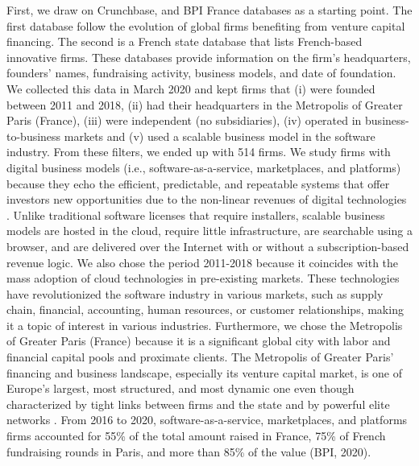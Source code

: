 \documentclass[12pt]{article}
\begin{document}
First, we draw on Crunchbase, and BPI France databases as a starting point. The first database follow the evolution of global firms benefiting from venture capital financing. The second is a French state database that lists French-based innovative firms. These databases provide information on the firm’s headquarters, founders’ names, fundraising activity, business models, and date of foundation. We collected this data in March 2020 and kept firms that (i) were founded between 2011 and 2018, (ii) had their headquarters in the Metropolis of Greater Paris (France), (iii) were independent (no subsidiaries), (iv) operated in business-to-business markets and (v) used a scalable business model in the software industry. From these filters, we ended up with 514 firms. We study firms with digital business models (i.e., software-as-a-service, marketplaces, and platforms) because they echo the efficient, predictable, and repeatable systems that offer investors new opportunities due to the non-linear revenues of digital technologies \citep{nambisan2017digital}. Unlike traditional software licenses that require installers, scalable business models are hosted in the cloud, require little infrastructure, are searchable using a browser, and are delivered over the Internet with or without a subscription-based revenue logic. We also chose the period 2011-2018 because it coincides with the mass adoption of cloud technologies in pre-existing markets. These technologies have revolutionized the software industry in various markets, such as supply chain, financial, accounting, human resources, or customer relationships, making it a topic of interest in various industries. Furthermore, we chose the Metropolis of Greater Paris (France) because it is a significant global city with labor and financial capital pools and proximate clients. The Metropolis of Greater Paris’ financing and business landscape, especially its venture capital market, is one of Europe’s largest, most structured, and most dynamic one even though  characterized by tight links between firms and the state and by powerful elite networks \citep{milosevic2018skills}. From 2016 to 2020, software-as-a-service, marketplaces, and platforms firms accounted for 55\% of the total amount raised in France, 75\% of French fundraising rounds in Paris, and more than 85\% of the value (BPI, 2020).
\end{document}
